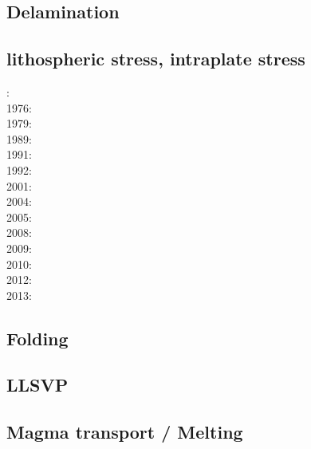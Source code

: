 \subsection*{Delamination}

\cite{baeg14}


\subsection*{lithospheric stress, intraplate stress}

: \cite{fouy75}\\
1976: \cite{riso76}\\
1979: \cite{riso79}\\
1989: \cite{boww89}\\
1991: \cite{worg91}\\
1992: \cite{rich92}\cite{wuvr92}\cite{zoba92}\\
2001: \cite{stsm01}\\
2004: \cite{ligu04}\\
2005: \cite{timr05}\\
2008: \cite{bilr08}\cite{ghhw08}\\
2009: \cite{ghhf09}\cite{nacl09}\\
2010: \cite{bepo10}\\
2012: \cite{nalr12}\cite{ghho12}\\
2013: \cite{ghhw13}


\subsection*{Folding}

\noindent
\cite{ramb68}
\cite{ramb70}
\cite{ramb71}
\cite{reds12}
\cite{regc13}

\subsection*{LLSVP}

\cite{limc13}
\cite{budt14}

\subsection*{Magma transport / Melting}

